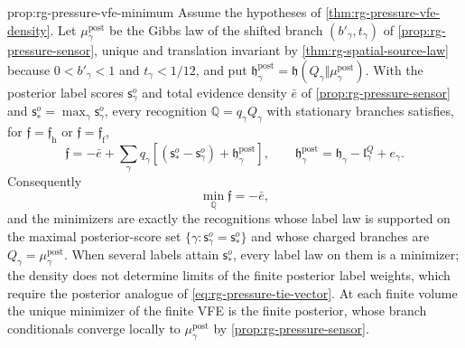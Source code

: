 {prop:rg-pressure-vfe-minimum}
Assume the hypotheses of \cref{thm:rg-pressure-vfe-density}. Let
$\mu^{\mathrm{post}}_\gamma$ be the Gibbs law of the shifted branch
$(b'_\gamma,t_\gamma)$ of \cref{prop:rg-pressure-sensor}, unique and
translation invariant by \cref{thm:rg-spatial-source-law} because
$0<b'_\gamma<1$ and $t_\gamma<1/12$, and put
$\mathfrak h^{\mathrm{post}}_\gamma=\mathfrak h(Q_\gamma\Vert\mu^{\mathrm{post}}_\gamma)$.
With the posterior label scores $\mathsf s^o_\gamma$ and total evidence
density $\bar e$ of \cref{prop:rg-pressure-sensor} and
$\mathsf s^o_*=\max_\gamma\mathsf s^o_\gamma$, every recognition
$\mathbb Q=q_\gamma Q_\gamma$ with stationary branches satisfies, for
$\mathfrak f=\mathfrak f_{\mathrm h}$ or $\mathfrak f=\mathfrak f_{\mathrm f}$,
\begin{equation}
 \mathfrak f=-\bar e+\sum_\gamma q_\gamma
 \left[(\mathsf s^o_*-\mathsf s^o_\gamma)+\mathfrak h^{\mathrm{post}}_\gamma\right],
 \qquad
 \mathfrak h^{\mathrm{post}}_\gamma=\mathfrak h_\gamma-\mathfrak l^Q_\gamma+e_\gamma.
 \label{eq:rg-pressure-vfe-decomposition}
\end{equation}
Consequently
\begin{equation}
 \min_{\mathbb Q}\mathfrak f=-\bar e,
 \label{eq:rg-pressure-vfe-minimum}
\end{equation}
and the minimizers are exactly the recognitions whose label law is supported
on the maximal posterior-score set
$\{\gamma:\mathsf s^o_\gamma=\mathsf s^o_*\}$ and whose charged branches are
$Q_\gamma=\mu^{\mathrm{post}}_\gamma$. When several labels attain
$\mathsf s^o_*$, every label law on them is a minimizer; the density does not
determine limits of the finite posterior label weights, which require the
posterior analogue of \cref{eq:rg-pressure-tie-vector}. At each finite volume
the unique minimizer of the finite VFE is the finite posterior, whose branch
conditionals converge locally to $\mu^{\mathrm{post}}_\gamma$ by
\cref{prop:rg-pressure-sensor}. 


